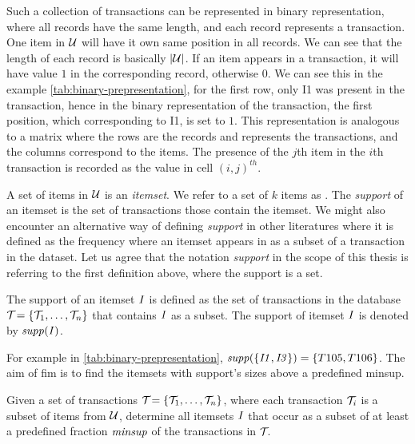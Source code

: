 Such a collection of transactions can be represented in binary representation, where all records have the same length, and each record represents a transaction.
One item in $\mathcal{U}$ will have it own same position in all records.
We can see that the length of each record is basically $|\mathcal{U}|$.
If an item appears in a transaction, it will have value $1$ in the corresponding record, otherwise $0$.
We can see this in the example \autoref{tab:binary-prepresentation}, for the first row, only I1 was present in the transaction, hence in the binary representation of the transaction, the first position, which corresponding to I1, is set to $1$.
This representation is analogous to a matrix where the rows are the records and represents the transactions, and the columns correspond to the items.
The presence of the $\mathit{j}$th item in the $\mathit{i}$th transaction is recorded as the value in cell $\mathit{(i, j)}^{th}$.

A set of items in $\mathcal{U}$ is an \textit{itemset}.
We refer to a set of $k$ items as \kItemset.
The \textit{support} of an itemset is the set of transactions those contain the itemset.
We might also encounter an alternative way of defining \textit{support} in other literatures where it is defined as the frequency where an itemset appears in as a subset of a transaction in the dataset.
Let us agree that the notation \textit{support} in the scope of this thesis is referring to the first definition above, where the support is a set.

\begin{definition}[Support]
    The support of an itemset $\mathit{I}$ is defined as the set of transactions in the database $\mathcal{T}_{} = \{\mathcal{T}_{1}, \dots, \mathcal{T}_{n}\}{}$ that contains $\mathit{I}$ as a subset.
    The support of itemset $\mathit{I}$ is denoted by $\mathit{supp({I})}$.
\end{definition}
For example in \autoref{tab:binary-prepresentation}, $\mathit{supp({\{I1, I3\}})} = \{T105, T106\}$.
The aim of \acl{fim} is to find the itemsets with support's sizes above a predefined \ac{minsup}.

\begin{definition}
    Given a set of transactions $\mathcal{T}_{} = \{\mathcal{T}_{1}, \dots, \mathcal{T}_{n}\}{}$, where each transaction $\mathcal{T}_{i}$ is a subset of items from $\mathcal{U}$, determine all itemsets $\mathit{I}$ that occur as a subset of at least a predefined fraction $\mathit{minsup}$ of the transactions in $\mathcal{T}_{}$.
\end{definition}

